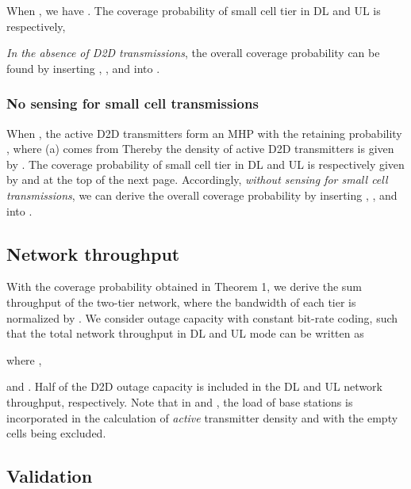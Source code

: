 \documentclass[twocolumn,english]{IEEEtran}
\theoremstyle{plain}
\theoremstyle{definition}
\begin{document}
When , we have .
The coverage probability of small cell tier in DL and UL is respectively,


\textit{\emph{In the absence of D2D transmissions}}, the overall coverage
probability can be found by inserting , ,
 and  into .


\subsubsection{No sensing for small cell transmissions }

When , the active D2D transmitters
form an MHP with the retaining probability ,
where (a) comes from 
Thereby the density of active D2D transmitters is given by .
The coverage probability of small cell tier in DL and UL is respectively
given by  and 
at the top of the next page. Accordingly, \textit{\emph{without sensing
for small cell transmissions}}, we can derive the overall coverage
probability by inserting , ,
 and  into
.

\begin{figure*}[tbh]


\end{figure*}



\subsection{Network throughput }

With the coverage probability obtained in Theorem 1, we derive the
sum throughput of the two-tier network, where the bandwidth of each
tier is normalized by . We consider outage capacity with constant
bit-rate coding, such that the total network throughput in DL and
UL mode can be written as


where ,

and .
Half of the D2D outage capacity is included in the DL and UL network
throughput, respectively. Note that in  and
, the load of base stations is incorporated
in the calculation of \emph{active} transmitter density 
and  with the empty cells being
excluded.


\subsection{Validation}
\end{document}
